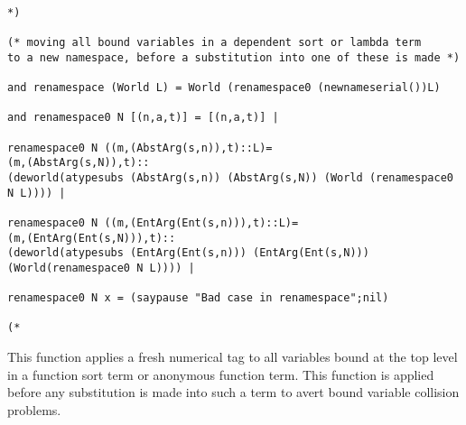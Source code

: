 \documentclass{article}
\begin{document}
\begin{verbatim}

*)

(* moving all bound variables in a dependent sort or lambda term
to a new namespace, before a substitution into one of these is made *)

and renamespace (World L) = World (renamespace0 (newnameserial())L)

and renamespace0 N [(n,a,t)] = [(n,a,t)] |

renamespace0 N ((m,(AbstArg(s,n)),t)::L)=
(m,(AbstArg(s,N)),t)::
(deworld(atypesubs (AbstArg(s,n)) (AbstArg(s,N)) (World (renamespace0 N L)))) |

renamespace0 N ((m,(EntArg(Ent(s,n))),t)::L)=
(m,(EntArg(Ent(s,N))),t)::
(deworld(atypesubs (EntArg(Ent(s,n))) (EntArg(Ent(s,N))) (World(renamespace0 N L)))) |

renamespace0 N x = (saypause "Bad case in renamespace";nil)

(*

\end{verbatim}

This function applies a fresh numerical tag to all variables bound at the top level in a function sort term or anonymous function term.  This function is applied before
any substitution is made into such a term to avert bound variable collision problems.
\end{document}
